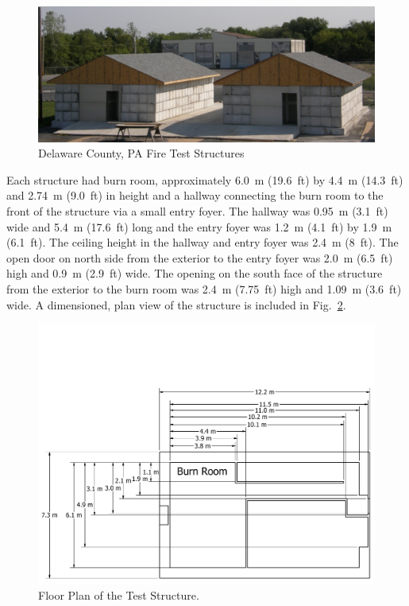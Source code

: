 \documentclass[12pt,oneside]{book}
\begin{document}
\begin{figure}[!ht]
	\includegraphics[width=6in]{../Figures/Pictures/DelCo_Structures}
	\caption{Delaware County, PA Fire Test Structures}
	\label{fig:Delaware_County,_PA_Fire_Test_Structures}
\end{figure}

Each structure had burn room, approximately 6.0~m (19.6~ft) by 4.4~m (14.3~ft) and 2.74~m (9.0~ft) in height and a hallway connecting the burn room to the front of the structure via a small entry foyer. The hallway was 0.95~m (3.1~ft) wide and 5.4~m (17.6~ft) long and the entry foyer was 1.2~m (4.1~ft) by 1.9~m (6.1~ft). The ceiling height in the hallway and entry foyer was 2.4~m (8~ft).  The open door on north side from the exterior to the entry foyer was 2.0~m (6.5~ft) high and 0.9~m (2.9~ft) wide. The opening on the south face of the structure from the exterior to the burn room was 2.4~m (7.75~ft) high and 1.09~m (3.6~ft) wide. A dimensioned, plan view of the structure is included in Fig.~\ref{fig:Test_Structure_Floor_Plan}.


\begin{figure}[!ht]
	\includegraphics[width=\columnwidth]{../Figures/Floor_Plans/PDFs/East_Structure/DelCo_2012_East_Structure_Plain}
	\caption{Floor Plan of the Test Structure.}
	\label{fig:Test_Structure_Floor_Plan}
\end{figure}
\end{document}
